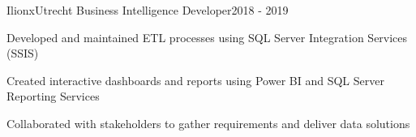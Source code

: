 \resumeSubheading
  {Ilionx}{Utrecht}
  {Business Intelligence Developer}{2018 - 2019}
  \vspace{\experienceItemSpacing}
  \resumeItemListStart
\item Developed and maintained ETL processes using SQL Server Integration Services (SSIS)
\item Created interactive dashboards and reports using Power BI and SQL Server Reporting Services
\item Collaborated with stakeholders to gather requirements and deliver data solutions
  \resumeItemListEnd